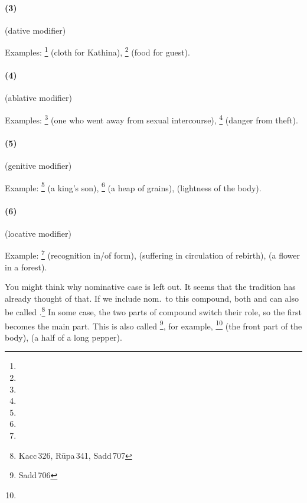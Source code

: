 \paragraph*{(3) } (dative modifier)\par
Examples: \footnote{} (cloth for Kathina), \footnote{} (food for guest).

\paragraph*{(4) } (ablative modifier)\par
Examples: \footnote{} (one who went away from sexual intercourse), \footnote{} (danger from theft).

\paragraph*{(5) } (genitive modifier)\par
Example: \footnote{} (a king's son), \footnote{} (a heap of grains),  (lightness of the body).

\paragraph*{(6) } (locative modifier)\par
Example: \footnote{} (recognition in/of form),  (suffering in circulation of rebirth),  (a flower in a forest).

\bigskip
You might think why nominative case is left out. It seems that the tradition has already thought of that. If we include nom.\ to this compound, both  and  can also be called .\footnote{Kacc\,326, R\=upa\,341, Sadd\,707} In some case, the two parts of compound switch their role, so the first becomes the main part. This is also called \footnote{Sadd\,706}, for example, \footnote{} (the front part of the body),  (a half of a long pepper).

